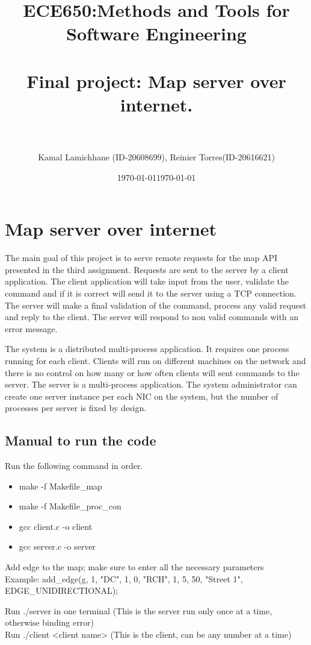 \documentclass[10pt]{article}
\date{\AdvanceDate[-1]\today}
\title{	
\normalfont \normalsize 
\textbf{ECE650:Methods and Tools for Software Engineering} \\ [10pt] %
\horrule{0.5pt} \\[0.4cm] %
\huge Final project: Map server over internet. \\ %
\horrule{2pt} \\[0.5cm] %
}
\author{Kamal Lamichhane (ID-20608699), Reinier Torres(ID-20616621)}
\date{\AdvanceDate[-1]\today}
\begin{document}
\maketitle %


\section{Map server over internet}
The main goal of this project is to serve remote requests for the map API
presented in the third assignment. Requests are sent to the server by a client
application. The client application will take input from the user, validate the
command and if it is correct will send it to the server using a TCP connection.
The server will make a final validation of the command, process any valid
request and reply to the client. The server will respond to non valid
commands with an error message.

The system is a distributed multi-process application. It requires one process
running for each client. Clients will run on different machines on the network
and there is no control on how many or how often clients will sent commands to
the server. The server is a multi-process application. The system administrator
can create one server instance per each NIC on the system, but the number of
processes per server is fixed by design.

\subsection{Manual to run the code}
Run the following command in order.\\
\begin{itemize}
\item make -f Makefile\_map
\item make -f Makefile\_proc\_con
\item gcc client.c -o client
\item gcc server.c -o server
\end{itemize}
Add edge to the map; make sure to enter all the necessary parameters\\
Example: add\_edge(g, 1, "DC",  1, 0, "RCH", 1, 5, 50, "Street 1",  EDGE\_UNIDIRECTIONAL);

Run ./server in one terminal (This is the server run only once at a time, otherwise binding error)\\
Run ./client <client name> (This is the client, can be any number at a time)\\
\end{document}
